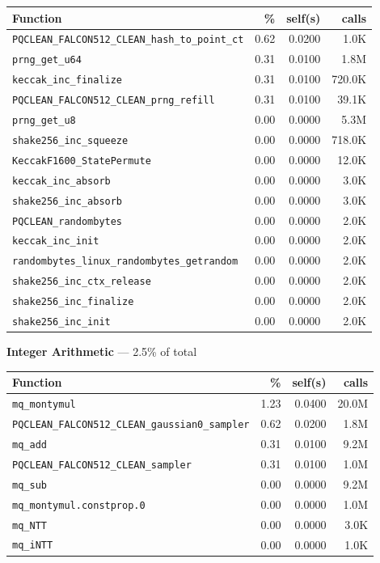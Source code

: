 \documentclass[11pt,a4paper]{article}
\begin{document}
\begin{longtable}{p{7.5cm}rrr}
\toprule
Function & \% & self(s) & calls \\
\midrule
\endhead
  \texttt{PQCLEAN\_FALCON512\_CLEAN\_hash\_to\_point\_ct} & 0.62 & 0.0200 & 1.0K \\
  \texttt{prng\_get\_u64} & 0.31 & 0.0100 & 1.8M \\
  \texttt{keccak\_inc\_finalize} & 0.31 & 0.0100 & 720.0K \\
  \texttt{PQCLEAN\_FALCON512\_CLEAN\_prng\_refill} & 0.31 & 0.0100 & 39.1K \\
  \texttt{prng\_get\_u8} & 0.00 & 0.0000 & 5.3M \\
  \texttt{shake256\_inc\_squeeze} & 0.00 & 0.0000 & 718.0K \\
  \texttt{KeccakF1600\_StatePermute} & 0.00 & 0.0000 & 12.0K \\
  \texttt{keccak\_inc\_absorb} & 0.00 & 0.0000 & 3.0K \\
  \texttt{shake256\_inc\_absorb} & 0.00 & 0.0000 & 3.0K \\
  \texttt{PQCLEAN\_randombytes} & 0.00 & 0.0000 & 2.0K \\
  \texttt{keccak\_inc\_init} & 0.00 & 0.0000 & 2.0K \\
  \texttt{randombytes\_linux\_randombytes\_getrandom} & 0.00 & 0.0000 & 2.0K \\
  \texttt{shake256\_inc\_ctx\_release} & 0.00 & 0.0000 & 2.0K \\
  \texttt{shake256\_inc\_finalize} & 0.00 & 0.0000 & 2.0K \\
  \texttt{shake256\_inc\_init} & 0.00 & 0.0000 & 2.0K \\
\bottomrule
\end{longtable}

\noindent\colorbox{intcolor}{\strut \textbf{Integer Arithmetic} --- 2.5\% of total}
\vspace{2pt}

\begin{longtable}{p{7.5cm}rrr}
\toprule
Function & \% & self(s) & calls \\
\midrule
\endhead
  \texttt{mq\_montymul} & 1.23 & 0.0400 & 20.0M \\
  \texttt{PQCLEAN\_FALCON512\_CLEAN\_gaussian0\_sampler} & 0.62 & 0.0200 & 1.8M \\
  \texttt{mq\_add} & 0.31 & 0.0100 & 9.2M \\
  \texttt{PQCLEAN\_FALCON512\_CLEAN\_sampler} & 0.31 & 0.0100 & 1.0M \\
  \texttt{mq\_sub} & 0.00 & 0.0000 & 9.2M \\
  \texttt{mq\_montymul.constprop.0} & 0.00 & 0.0000 & 1.0M \\
  \texttt{mq\_NTT} & 0.00 & 0.0000 & 3.0K \\
  \texttt{mq\_iNTT} & 0.00 & 0.0000 & 1.0K \\
\bottomrule
\end{longtable}
\end{document}
